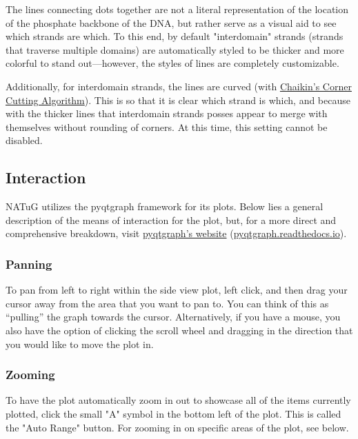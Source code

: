 \documentclass[titlepage]{article}
\begin{document}
	The lines connecting dots together are not a literal representation of the location of the phosphate backbone of the DNA, but rather serve as a visual aid to see which strands are which. To this end, by default "interdomain" strands (strands that traverse multiple domains) are automatically styled to be thicker and more colorful to stand out—however, the styles of lines are completely customizable.
	
	Additionally, for interdomain strands, the lines are curved (with \href{https://www.cs.unc.edu/~dm/UNC/COMP258/LECTURES/Chaikins-Algorithm.pdf}{Chaikin's Corner Cutting Algorithm}). This is so that it is clear which strand is which, and because with the thicker lines that interdomain strands posses appear to merge with themselves without rounding of corners. At this time, this setting cannot be disabled.
	
	\subsection{Interaction} \label{sect:plot-interaction}
	NATuG utilizes the pyqtgraph framework for its plots. Below lies a general description of the means of interaction for the plot, but, for a more direct and comprehensive breakdown, visit \href{https://pyqtgraph.readthedocs.io/en/latest/user_guide/mouse_interaction.html}{pyqtgraph’s website} (\href{https://pyqtgraph.readthedocs.io/en/latest/user_guide/mouse_interaction.html}{pyqtgraph.readthedocs.io}).
	
	\subsubsection{Panning}
	To pan from left to right within the side view plot, left click, and then drag your cursor away from the area that you want to pan to. You can think of this as “pulling” the graph towards the cursor. Alternatively, if you have a mouse, you also have the option of clicking the scroll wheel and dragging in the direction that you would like to move the plot in.
	
	\subsubsection{Zooming}
	
	To have the plot automatically zoom in out to showcase all of the items currently plotted, click the small "A" symbol in the bottom left of the plot. This is called the "Auto Range" button. For zooming in on specific areas of the plot, see below.
	
\end{document}
